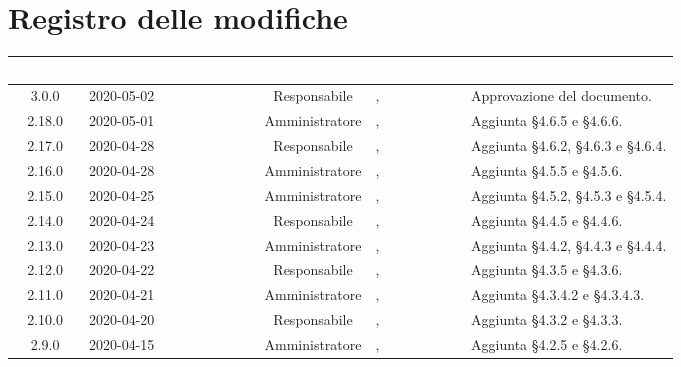 \section*{Registro delle modifiche}
{
\renewcommand{\arraystretch}{1.5}
\centering
\begin{longtable}{ c c  C{2.3cm} c C{3cm} C{3.2cm}}
\textcolor{white}{\textbf{Versione}}&
\textcolor{white}{\textbf{Data}}&
\textcolor{white}{\textbf{Nominativo}}&
\textcolor{white}{\textbf{Ruolo}}&
\textcolor{white}{\textbf{Verificatore}}&
\textcolor{white}{\textbf{Descrizione}}\\	
\endhead

3.0.0 & 2020-05-02 & \DF{} & Responsabile &  \AT{}, \PF{} & Approvazione del documento.  \\

2.18.0 & 2020-05-01 & \BR{} & Amministratore &  \AT{}, \PF{} & Aggiunta §4.6.5 e §4.6.6.  \\

2.17.0 & 2020-04-28 & \LD{} & Responsabile &  \AT{}, \PF{} & Aggiunta §4.6.2, §4.6.3 e §4.6.4.  \\

2.16.0 & 2020-04-28 & \SE{} & Amministratore &  \AT{}, \PF{} & Aggiunta §4.5.5 e §4.5.6.  \\

2.15.0 & 2020-04-25 & \BR{} & Amministratore &  \AT{}, \PF{} & Aggiunta §4.5.2, §4.5.3 e §4.5.4.  \\

2.14.0 & 2020-04-24 & \LD{} & Responsabile &  \AT{}, \PF{} & Aggiunta §4.4.5 e §4.4.6.  \\

2.13.0 & 2020-04-23 & \BR{} & Amministratore &  \AT{}, \PF{} & Aggiunta §4.4.2, §4.4.3 e §4.4.4.  \\

2.12.0 & 2020-04-22 & \LD{} & Responsabile &  \AT{}, \PF{} & Aggiunta §4.3.5 e §4.3.6.  \\

2.11.0 & 2020-04-21 & \SE{} & Amministratore &  \AT{}, \PF{} & Aggiunta §4.3.4.2 e §4.3.4.3.  \\

2.10.0 & 2020-04-20 & \LD{} & Responsabile &  \AT{}, \PF{} & Aggiunta §4.3.2 e §4.3.3.  \\

2.9.0 & 2020-04-15 & \BR{} & Amministratore &  \AT{}, \PF{} & Aggiunta §4.2.5 e §4.2.6.  \\


\end{longtable}}
